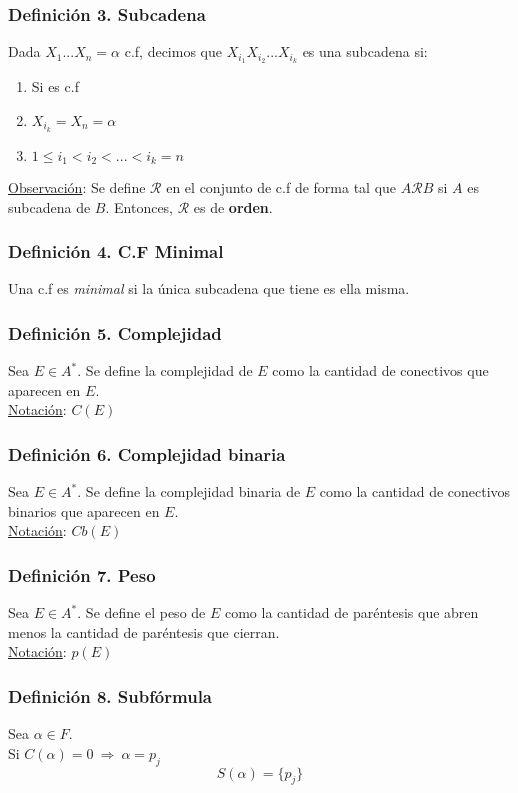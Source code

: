 \documentclass{article}
\newcommand{\relates}{\mathcal{R}}                      %
\newcommand{\Rightarrows}{\: \Rightarrow \:}            %
\begin{document}
\subsubsection*{Definición 3. Subcadena}
Dada $X_1 ... X_n = \alpha$ c.f, decimos que $X_{i_1} X_{i_2} ...X_{i_k}$
es una subcadena si:
\begin{enumerate}
	\item Si es c.f
	\item $X_{i_k} = X_n = \alpha$
	\item $1 \leq i_1 < i_2 < ... < i_k = n$
\end{enumerate}
\underline{Observación}: Se define $\relates$ en el conjunto de c.f de forma tal que $A \relates B$ 
si $A$ es subcadena de $B$. Entonces, $\relates$ es de \textbf{orden}.

\subsubsection*{Definición 4. C.F Minimal}
Una c.f es \emph{minimal} si la única subcadena que tiene es ella misma.

\subsubsection*{Definición 5. Complejidad}
Sea $E \in A^*$. Se define la complejidad de $E$ como la cantidad de conectivos que aparecen en $E$.
\\\underline{Notación}: $C(E)$

\subsubsection*{Definición 6. Complejidad binaria}
Sea $E \in A^*$. Se define la complejidad binaria de $E$ como la cantidad de conectivos binarios 
que aparecen en $E$.
\\\underline{Notación}: $Cb(E)$

\subsubsection*{Definición 7. Peso}
Sea $E \in A^*$. Se define el peso de $E$ como la cantidad de paréntesis que abren menos la cantidad de paréntesis que cierran.
\\\underline{Notación}: $p(E)$


\subsubsection*{Definición 8. Subfórmula}
Sea $\alpha \in F$.
\\Si $C(\alpha) = 0 \Rightarrows \alpha = p_j$
\begin{equation*}
	S(\alpha) = \{p_j\}
\end{equation*}
\end{document}
